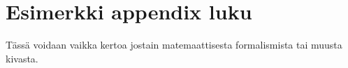 \section{Esimerkki appendix luku}

Tässä voidaan vaikka kertoa jostain matemaattisesta formalismista tai muusta kivasta.
